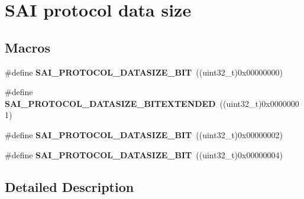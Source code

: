 \hypertarget{group___s_a_i___protocol___data_size}{}\section{S\+AI protocol data size}
\label{group___s_a_i___protocol___data_size}
\subsection*{Macros}
\begin{DoxyCompactItemize}
\item 
\#define {\bfseries S\+A\+I\+\_\+\+P\+R\+O\+T\+O\+C\+O\+L\+\_\+\+D\+A\+T\+A\+S\+I\+Z\+E\+\_\+B\+IT}~((uint32\+\_\+t)0x00000000)\hypertarget{group___s_a_i___protocol___data_size_ga3543a392b7a6b9347c8d9ede746b6dd4}{}\label{group___s_a_i___protocol___data_size_ga3543a392b7a6b9347c8d9ede746b6dd4}

\item 
\#define {\bfseries S\+A\+I\+\_\+\+P\+R\+O\+T\+O\+C\+O\+L\+\_\+\+D\+A\+T\+A\+S\+I\+Z\+E\+\_\+B\+I\+T\+E\+X\+T\+E\+N\+D\+ED}~((uint32\+\_\+t)0x00000001)\hypertarget{group___s_a_i___protocol___data_size_gab7f4be685e0e32751dd4bc35b48706b9}{}\label{group___s_a_i___protocol___data_size_gab7f4be685e0e32751dd4bc35b48706b9}

\item 
\#define {\bfseries S\+A\+I\+\_\+\+P\+R\+O\+T\+O\+C\+O\+L\+\_\+\+D\+A\+T\+A\+S\+I\+Z\+E\+\_\+B\+IT}~((uint32\+\_\+t)0x00000002)\hypertarget{group___s_a_i___protocol___data_size_ga4a4f4a57fa6b95d3dae62a1c2f85a5df}{}\label{group___s_a_i___protocol___data_size_ga4a4f4a57fa6b95d3dae62a1c2f85a5df}

\item 
\#define {\bfseries S\+A\+I\+\_\+\+P\+R\+O\+T\+O\+C\+O\+L\+\_\+\+D\+A\+T\+A\+S\+I\+Z\+E\+\_\+B\+IT}~((uint32\+\_\+t)0x00000004)\hypertarget{group___s_a_i___protocol___data_size_ga41bcf07254a2f5abc1aef7103b27fbd1}{}\label{group___s_a_i___protocol___data_size_ga41bcf07254a2f5abc1aef7103b27fbd1}

\end{DoxyCompactItemize}


\subsection{Detailed Description}
